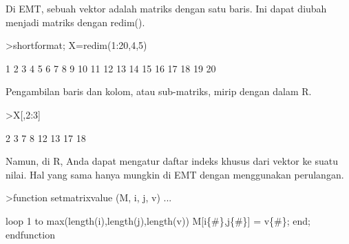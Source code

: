 \documentclass[12pt,arial,letterpaper]{book}
\begin{document}
\begin{eulercomment}
\begin{eulercomment}
\begin{eulercomment}
\begin{eulercomment}
\begin{eulercomment}
\begin{eulercomment}
\begin{eulercomment}
\begin{eulercomment}
\begin{eulercomment}
\begin{eulercomment}
\begin{eulercomment}
\begin{eulercomment}
\begin{eulercomment}
\begin{eulercomment}
\begin{eulercomment}
\begin{eulercomment}
\begin{eulercomment}
\begin{eulercomment}
\begin{eulercomment}
\begin{eulercomment}
\begin{eulercomment}
\begin{eulercomment}
\begin{eulercomment}
\begin{eulercomment}
\begin{eulercomment}
\begin{eulercomment}
\begin{eulercomment}
\begin{eulercomment}
\begin{eulercomment}
\begin{eulercomment}
\begin{eulercomment}
\begin{eulercomment}
\begin{eulercomment}
\begin{eulercomment}
\begin{eulercomment}
\begin{eulercomment}
\begin{eulercomment}
Di EMT, sebuah vektor adalah matriks dengan satu baris. Ini dapat
diubah menjadi matriks dengan redim().
\end{eulercomment}
\begin{eulerprompt}
>shortformat; X=redim(1:20,4,5)
\end{eulerprompt}
\begin{euleroutput}
          1         2         3         4         5 
          6         7         8         9        10 
         11        12        13        14        15 
         16        17        18        19        20 
\end{euleroutput}
\begin{eulercomment}
Pengambilan baris dan kolom, atau sub-matriks, mirip dengan dalam R.
\end{eulercomment}
\begin{eulerprompt}
>X[,2:3]
\end{eulerprompt}
\begin{euleroutput}
          2         3 
          7         8 
         12        13 
         17        18 
\end{euleroutput}
\begin{eulercomment}
Namun, di R, Anda dapat mengatur daftar indeks khusus dari vektor ke
suatu nilai. Hal yang sama hanya mungkin di EMT dengan menggunakan
perulangan.
\end{eulercomment}
\begin{eulerprompt}
>function setmatrixvalue (M, i, j, v) ...
\end{eulerprompt}
\begin{eulerudf}
  loop 1 to max(length(i),length(j),length(v))
     M[i\{#\},j\{#\}] = v\{#\};
  end;
  endfunction
\end{eulerudf}
\begin{eulercomment}

\end{eulercomment}
\end{eulercomment}
\end{eulercomment}
\end{eulercomment}
\end{eulercomment}
\end{eulercomment}
\end{eulercomment}
\end{eulercomment}
\end{eulercomment}
\end{eulercomment}
\end{eulercomment}
\end{eulercomment}
\end{eulercomment}
\end{eulercomment}
\end{eulercomment}
\end{eulercomment}
\end{eulercomment}
\end{eulercomment}
\end{eulercomment}
\end{eulercomment}
\end{eulercomment}
\end{eulercomment}
\end{eulercomment}
\end{eulercomment}
\end{eulercomment}
\end{eulercomment}
\end{eulercomment}
\end{eulercomment}
\end{eulercomment}
\end{eulercomment}
\end{eulercomment}
\end{eulercomment}
\end{eulercomment}
\end{eulercomment}
\end{eulercomment}
\end{eulercomment}
\end{eulercomment}
\end{document}

